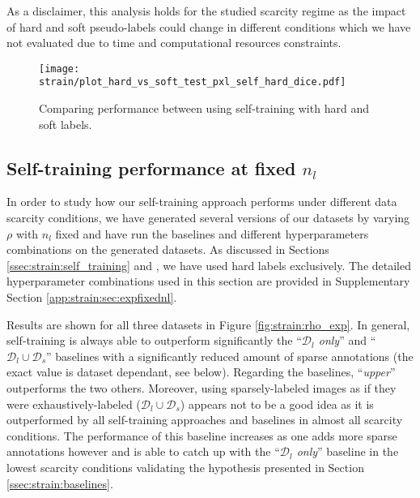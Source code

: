 As a disclaimer, this analysis holds for the studied scarcity regime as the impact of hard and soft pseudo-labels could change in different conditions which we have not evaluated due to time and computational resources constraints. 

\begin{figure}
  \centering
  \texttt{[image: strain/plot\_hard\_vs\_soft\_test\_pxl\_self\_hard\_dice.pdf]}
  \caption{Comparing performance between using self-training with hard and soft labels.}
  \label{fig:strain:hard_vs_soft}
\end{figure}

\subsection{Self-training performance at fixed $n_l$}
\label{ssec:strain:fixednl}

In order to study how our self-training approach performs under different data scarcity conditions, we have generated several versions of our datasets by varying $\rho$ with $n_l$ fixed and have run the baselines and different hyperparameters combinations on the generated datasets. As discussed in Sections \ref{ssec:strain:self_training} and , we have used hard labels exclusively. The detailed hyperparameter combinations used in this section are provided in Supplementary Section \ref{app:strain:sec:expfixednl}.

Results are shown for all three datasets in Figure \ref{fig:strain:rho_exp}. In general, self-training is always able to outperform significantly the ``\textit{$\mathcal{D}_l$ only}'' and ``$\mathcal{D}_l \cup \mathcal{D}_s$'' baselines with a significantly reduced amount of sparse annotations (the exact value is dataset dependant, see below). Regarding the baselines, ``\textit{upper}''  outperforms the two others. Moreover, using sparsely-labeled images as if they were exhaustively-labeled (\ie $\mathcal{D}_l \cup \mathcal{D}_s$) appears not to be a good idea as it is outperformed by all self-training approaches and baselines in almost all scarcity conditions. The performance of this baseline increases as one adds more sparse annotations however and is able to catch up with the ``\textit{$\mathcal{D}_l$ only}'' baseline in the lowest scarcity conditions validating the hypothesis presented in Section \ref{ssec:strain:baselines}. 

